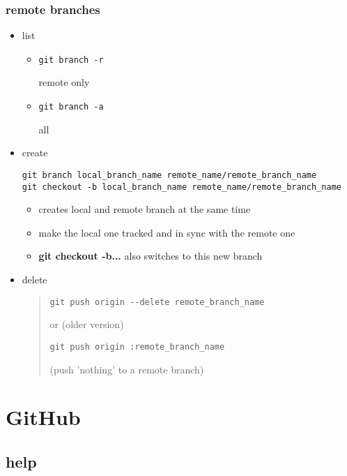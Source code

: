 \documentclass{report}
\begin{document}
\subsection{remote branches}
\begin{itemize}
\item list
\begin{itemize}

\item \begin{verbatim}
git branch -r
\end{verbatim}
remote only

\item \begin{verbatim}
git branch -a
\end{verbatim}
 all
\end{itemize}

\item create
\begin{verbatim}
git branch local_branch_name remote_name/remote_branch_name
git checkout -b local_branch_name remote_name/remote_branch_name
\end{verbatim}
\begin{itemize}
\item creates local and remote branch at the same time
\item make the local one tracked and in sync with the remote one
\item \textbf{git checkout -b...} also switches to this new branch 
\end{itemize}

\item delete
\begin{quote}
\begin{verbatim}
git push origin --delete remote_branch_name
\end{verbatim}
or (older version)
\begin{verbatim}
git push origin :remote_branch_name
\end{verbatim}
(push 'nothing' to a remote branch)
\end{quote}

\end{itemize}

\chapter{GitHub}
\section{help}
\end{document}
